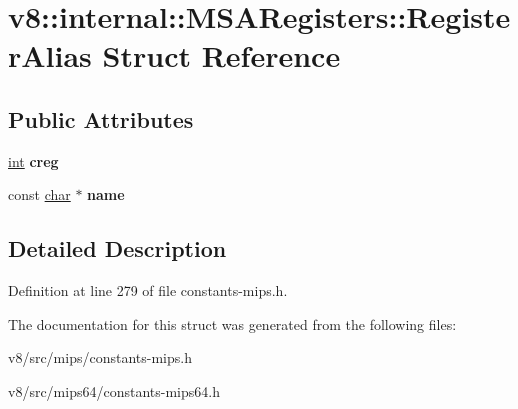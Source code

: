 \hypertarget{structv8_1_1internal_1_1MSARegisters_1_1RegisterAlias}{}\section{v8\+:\+:internal\+:\+:M\+S\+A\+Registers\+:\+:Register\+Alias Struct Reference}
\label{structv8_1_1internal_1_1MSARegisters_1_1RegisterAlias}
\subsection*{Public Attributes}
\begin{DoxyCompactItemize}
\item 
\mbox{\label{structv8_1_1internal_1_1MSARegisters_1_1RegisterAlias_a2907a5e94ed81390b1766741d50d1cce}} 
\mbox{\hyperlink{classint}{int}} {\bfseries creg}
\item 
\mbox{\label{structv8_1_1internal_1_1MSARegisters_1_1RegisterAlias_a469c85811f1b61331bd6018cbf4116b8}} 
const \mbox{\hyperlink{classchar}{char}} $\ast$ {\bfseries name}
\end{DoxyCompactItemize}


\subsection{Detailed Description}


Definition at line 279 of file constants-\/mips.\+h.



The documentation for this struct was generated from the following files\+:\begin{DoxyCompactItemize}
\item 
v8/src/mips/constants-\/mips.\+h\item 
v8/src/mips64/constants-\/mips64.\+h\end{DoxyCompactItemize}
